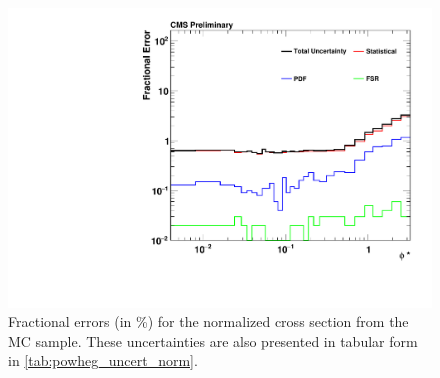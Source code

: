 \begin{figure}[!p]
    \centering
    \includegraphics[width=\textwidth]{figures/powheg_uncertainty_normalized.pdf}
    \caption[
        Fractional errors for the normalized cross section from the
        \POWHEG MC sample.
    ]{
        Fractional errors (in \%) for the normalized cross section from the
        \POWHEG MC sample. These uncertainties are also presented in tabular
        form in \cref{tab:powheg_uncert_norm}.
    }
    \label{fig:powheg_uncert_norm}
\end{figure}
